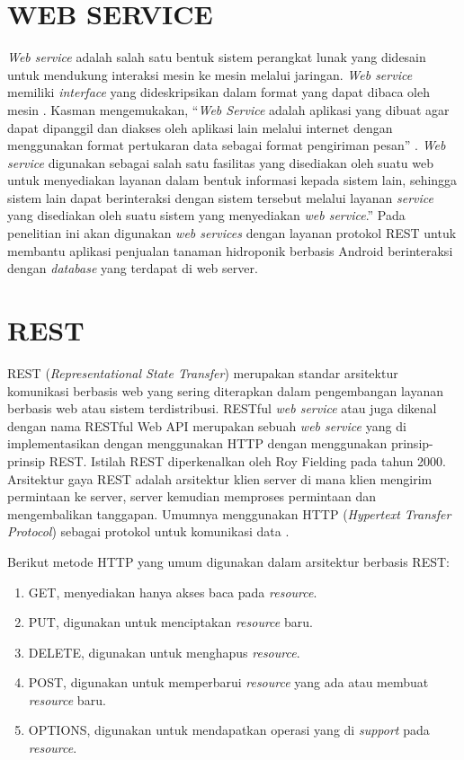 \section{\uppercase{Web Service}}
\textit{Web service} adalah salah satu bentuk sistem perangkat lunak yang didesain untuk mendukung interaksi mesin ke mesin melalui jaringan. \textit{Web service} memiliki \textit{interface} yang dideskripsikan dalam format yang dapat dibaca oleh mesin \citep{prabowo2016teknologi}. Kasman mengemukakan, “\textit{Web Service} adalah aplikasi yang dibuat agar dapat dipanggil dan diakses oleh aplikasi lain melalui internet dengan menggunakan format pertukaran data sebagai format pengiriman pesan” \citep{kasman2015}. \textit{Web service} digunakan sebagai salah satu fasilitas yang disediakan oleh suatu web untuk menyediakan layanan dalam bentuk informasi kepada sistem lain, sehingga sistem lain dapat berinteraksi dengan sistem tersebut melalui layanan \textit{service} yang disediakan oleh suatu sistem yang menyediakan \textit{web service}.” Pada penelitian ini akan digunakan \textit{web services} dengan layanan protokol REST untuk membantu aplikasi penjualan tanaman hidroponik berbasis Android berinteraksi dengan \textit{database} yang terdapat di web server.

\section{\uppercase{REST}}
REST (\textit{Representational State Transfer}) merupakan standar arsitektur komunikasi berbasis web yang sering diterapkan dalam pengembangan layanan berbasis web atau sistem terdistribusi. RESTful \textit{web service} atau juga dikenal dengan nama RESTful Web API merupakan sebuah \textit{web service} yang di implementasikan dengan menggunakan HTTP dengan menggunakan prinsip-prinsip REST. Istilah REST diperkenalkan oleh Roy Fielding pada tahun 2000. Arsitektur gaya REST adalah arsitektur klien server di mana klien mengirim permintaan ke server, server kemudian memproses permintaan dan mengembalikan tanggapan. Umumnya menggunakan HTTP (\textit{Hypertext Transfer Protocol}) sebagai protokol untuk komunikasi data \citep{saputra2018}.

\par Berikut metode HTTP yang umum digunakan dalam arsitektur berbasis REST:
\begin{enumerate}
	\item GET, menyediakan hanya akses baca pada \textit{resource}.
	\item PUT, digunakan untuk menciptakan \textit{resource} baru.
	\item DELETE, digunakan untuk menghapus \textit{resource}.
	\item POST, digunakan untuk memperbarui \textit{resource} yang ada atau membuat \textit{resource} baru.
	\item OPTIONS, digunakan untuk mendapatkan operasi yang di \textit{support} pada \textit{resource}.
\end{enumerate}

